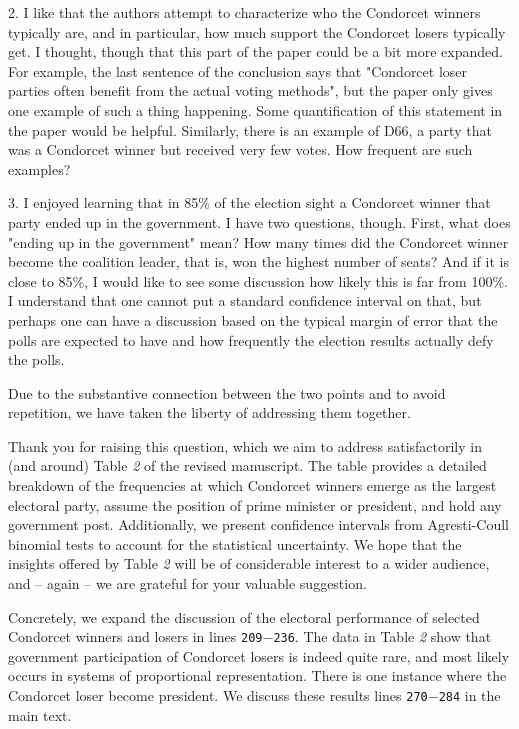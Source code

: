 \documentclass[a4paper, 12pt]{scrartcl}
\theoremstyle{break}
\newenvironment{changes}{\par\color{violet}\par\addvspace{\baselineskip}}{\par\addvspace{\baselineskip}}
\begin{document}
\begin{changes}
2. I like that the authors attempt to characterize who the Condorcet winners typically are, and in particular, how much support the Condorcet losers typically get. I thought, though that this part of the paper could be a bit more expanded. For example, the last sentence of the conclusion says that "Condorcet loser parties often benefit from the actual voting methods", but the paper only gives one example of such a thing happening. Some quantification of this statement in the paper would be helpful. Similarly, there is an example of D66, a party that was a Condorcet winner but received very few votes. How frequent are such examples?
\end{changes}

\begin{changes}
3. I enjoyed learning that in 85\% of the election sight a Condorcet winner that party ended up in the government. I have two questions, though. First, what does "ending up in the government" mean? How many times did the Condorcet winner become the coalition leader, that is, won the highest number of seats? And if it is close to 85\%, I would like to see some discussion how likely this is far from 100\%. I understand that one cannot put a standard confidence interval on that, but perhaps one can have a discussion based on the typical margin of error that the polls are expected to have and how frequently the election results actually defy the polls. 
\end{changes}

Due to the substantive connection between the two points and to avoid repetition, we have taken the liberty of addressing them together.

Thank you for raising this question, which we aim to address satisfactorily in (and around) Table \textit{2} of the revised manuscript. The table provides a detailed breakdown of the frequencies at which Condorcet winners emerge as the largest electoral party, assume the position of prime minister or president, and hold any government post. Additionally, we present confidence intervals from Agresti-Coull binomial tests to account for the statistical uncertainty. We hope that the insights offered by Table \textit{2} will be of considerable interest to a wider audience, and -- again -- we are grateful for your valuable suggestion.

Concretely, we expand the discussion of the electoral performance of selected Condorcet winners and losers in lines \texttt{209$-$236}. The data in Table \textit{2} show that government participation of Condorcet losers is indeed quite rare, and most likely occurs in systems of proportional representation. There is one instance where the Condorcet loser become president. We discuss these results lines \texttt{270$-$284} in the main text.
\end{document}
